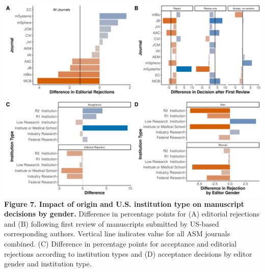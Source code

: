 \documentclass[11pt,]{article}
\begin{document}
\newpage

\includegraphics{Figure_7.png} \textbf{Figure 7. Impact of origin and
U.S. institution type on manuscript decisions by gender.} Difference in
percentage points for (A) editorial rejections and (B) following first
review of manuscripts submitted by US-based corresponding authors.
Vertical line indicates value for all ASM journals combined. (C)
Difference in percentage points for acceptance and editorial rejections
according to institution types and (D) acceptance decisions by editor
gender and institution type.

\newpage
\end{document}
